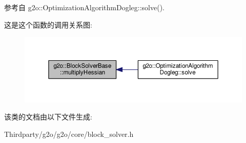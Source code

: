 参考自 g2o\-::\-Optimization\-Algorithm\-Dogleg\-::solve().



这是这个函数的调用关系图\-:
\nopagebreak
\begin{figure}[H]
\begin{center}
\leavevmode
\includegraphics[width=350pt]{classg2o_1_1BlockSolverBase_a4ff7072751bfa1b7fcf91f8219e18e13_icgraph}
\end{center}
\end{figure}




该类的文档由以下文件生成\-:\begin{DoxyCompactItemize}
\item 
Thirdparty/g2o/g2o/core/block\-\_\-solver.\-h\end{DoxyCompactItemize}
